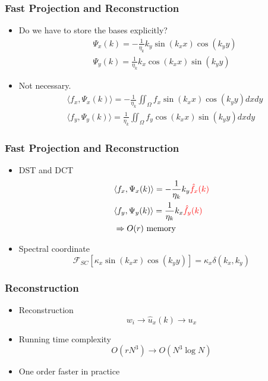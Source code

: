 \documentclass[serif,mathserif, 12pt]{beamer}
\begin{document}
\begin{frame}
  \frametitle{Fast Projection and Reconstruction}
  \begin{itemize}
  \item Do we have to store the bases explicitly?
    \[
    \begin{split}
      &\Psi_x(k) = -\frac{1}{\eta_k}k_y\sin(k_x x)\cos(k_y y) \\
      &\Psi_y(k) = \frac{1}{\eta_k}k_x\cos(k_x x)\sin(k_y y)
    \end{split}
    \]
  \item Not necessary.
    \[
    \begin{split}
    &\langle f_x, \Psi_x(k) \rangle = -\frac{1}{\eta_k}\iint_\Omega f_x \sin(k_x x)\cos(k_y y) dxdy \\
    &\langle f_y, \Psi_y(k) \rangle = \frac{1}{\eta_k}\iint_\Omega f_y \cos(k_x x) \sin(k_y y) dxdy
    \end{split}
    \]
  \end{itemize}
\end{frame}

\begin{frame}
  \frametitle{Fast Projection and Reconstruction}
  \begin{itemize}
  \item DST and DCT
    \[
    \begin{split}
      &\langle f_x, \Psi_x(k) \rangle = -\frac{1}{\eta_k}k_y \color{red}{\hat f_x(k)} \\
      &\langle f_y, \Psi_y(k) \rangle = \frac{1}{\eta_k}k_x \color{red} \hat f_y(k) \\
      &\Rightarrow O(r) \text{~memory}
    \end{split}
    \]
  \item Spectral coordinate
    \[
    \mathcal F_{SC}[\kappa_x \sin(k_x x) \cos(k_y y)] = \kappa_x\delta (k_x, k_y)
    \]
  \end{itemize}
\end{frame}

\begin{frame}
  \frametitle{Reconstruction}
  \begin{itemize}
  \item Reconstruction
    \[
    w_i \rightarrow \hat u_x(k) \rightarrow u_x
    \]
  \item Running time complexity
    \[
    O(rN^3) \rightarrow O(N^3\log N)
    \]
  \item One order faster in practice
  \end{itemize}
\end{frame}
\end{document}
